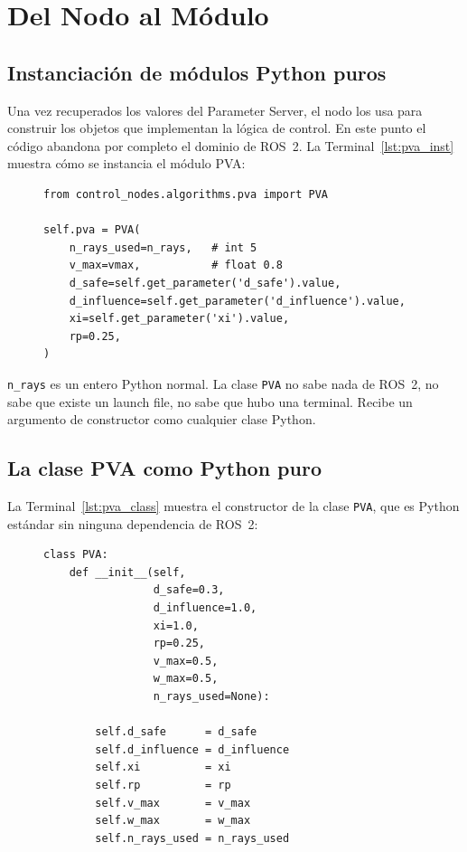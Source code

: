 \section{Del Nodo al Módulo}

\subsection{Instanciación de módulos Python puros}

Una vez recuperados los valores del Parameter Server, el nodo los usa para construir los objetos que implementan la lógica de control. En este punto el código abandona por completo el dominio de ROS~2. La Terminal~\ref{lst:pva_inst} muestra cómo se instancia el módulo PVA:

\begin{figure}[H]
\centering
\begin{lstlisting}[style=python, caption={Instanciación del módulo PVA desde el nodo.}, label={lst:pva_inst}]
from control_nodes.algorithms.pva import PVA

self.pva = PVA(
    n_rays_used=n_rays,   # int 5
    v_max=vmax,           # float 0.8
    d_safe=self.get_parameter('d_safe').value,
    d_influence=self.get_parameter('d_influence').value,
    xi=self.get_parameter('xi').value,
    rp=0.25,
)
\end{lstlisting}
\end{figure}

\texttt{n\_rays} es un entero Python normal. La clase \texttt{PVA} no sabe nada de ROS~2, no sabe que existe un launch file, no sabe que hubo una terminal. Recibe un argumento de constructor como cualquier clase Python.

\subsection{La clase PVA como Python puro}

La Terminal~\ref{lst:pva_class} muestra el constructor de la clase \texttt{PVA}, que es Python estándar sin ninguna dependencia de ROS~2:

\begin{figure}[H]
\centering
\begin{lstlisting}[style=python, caption={Constructor de la clase \texttt{PVA}.}, label={lst:pva_class}]
class PVA:
    def __init__(self,
                 d_safe=0.3,
                 d_influence=1.0,
                 xi=1.0,
                 rp=0.25,
                 v_max=0.5,
                 w_max=0.5,
                 n_rays_used=None):

        self.d_safe      = d_safe
        self.d_influence = d_influence
        self.xi          = xi
        self.rp          = rp
        self.v_max       = v_max
        self.w_max       = w_max
        self.n_rays_used = n_rays_used
\end{lstlisting}
\end{figure}

